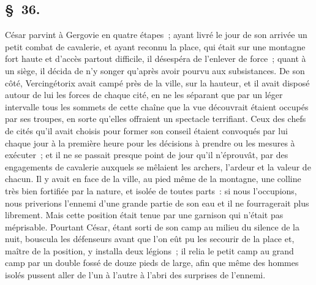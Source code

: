 \documentclass[french,twoside]{book} %
\begin{document}
\subsection[{§ 36.}]{ \textsc{§ 36.} }
\noindent César parvint à Gergovie en quatre étapes ; ayant livré le jour de son arrivée un petit combat de cavalerie, et ayant reconnu la place, qui était sur une montagne fort haute et d’accès partout difficile, il désespéra de l’enlever de force ; quant à un siège, il décida de n’y songer qu’après avoir pourvu aux subsistances. De son côté, Vercingétorix avait campé près de la ville, sur la hauteur, et il avait disposé autour de lui les forces de chaque cité, en ne les séparant que par un léger intervalle tous les sommets de cette chaîne que la vue découvrait étaient occupés par ses troupes, en sorte qu’elles offraient un spectacle terrifiant. Ceux des chefs de cités qu’il avait choisis pour former son conseil étaient convoqués par lui chaque jour à la première heure pour les décisions à prendre ou les mesures à exécuter ; et il ne se passait presque point de jour qu’il n’éprouvât, par des engagements de cavalerie auxquels se mêlaient les archers, l’ardeur et la valeur de chacun. Il y avait en face de la ville, au pied même de la montagne, une colline très bien fortifiée par la nature, et isolée de toutes parts : si nous l’occupions, nous priverions l’ennemi d’une grande partie de son eau et il ne fourragerait plus librement. Mais cette position était tenue par une garnison qui n’était pas méprisable. Pourtant César, étant sorti de son camp au milieu du silence de la nuit, bouscula les défenseurs avant que l’on eût pu les secourir de la place et, maître de la position, y installa deux légions ; il relia le petit camp au grand camp par un double fossé de douze pieds de large, afin que même des hommes isolés pussent aller de l’un à l’autre à l’abri des surprises de l’ennemi.
\end{document}
